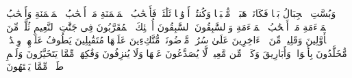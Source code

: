 \startbuffer[\q:56:5]
وَبُسَّتِ ٱلۡجِبَالُ بَسࣰّا%
\stopbuffer%
\startbuffer[\q:56:6]
فَكَانَتۡ هَبَاۤءࣰ مُّنۢبَثࣰّا%
\stopbuffer%
\startbuffer[\q:56:7]
وَكُنتُمۡ أَزۡوَٰجࣰا ثَلَٰثَةࣰ%
\stopbuffer%
\startbuffer[\q:56:8]
فَأَصۡحَٰبُ ٱلۡمَیۡمَنَةِ مَاۤ أَصۡحَٰبُ ٱلۡمَیۡمَنَةِ%
\stopbuffer%
\startbuffer[\q:56:9]
وَأَصۡحَٰبُ ٱلۡمَشۡءَمَةِ مَاۤ أَصۡحَٰبُ ٱلۡمَشۡءَمَةِ%
\stopbuffer%
\startbuffer[\q:56:10]
وَٱلسَّٰبِقُونَ ٱلسَّٰبِقُونَ%
\stopbuffer%
\startbuffer[\q:56:11]
أُو۟لَٰۤئِكَ ٱلۡمُقَرَّبُونَ%
\stopbuffer%
\startbuffer[\q:56:12]
فِی جَنَّٰتِ ٱلنَّعِیمِ%
\stopbuffer%
\startbuffer[\q:56:13]
ثُلَّةࣱ مِّنَ ٱلۡأَوَّلِینَ%
\stopbuffer%
\startbuffer[\q:56:14]
وَقَلِیلࣱ مِّنَ ٱلۡءَاخِرِینَ%
\stopbuffer%
\startbuffer[\q:56:15]
عَلَىٰ سُرُرࣲ مَّوۡضُونَةࣲ%
\stopbuffer%
\startbuffer[\q:56:16]
مُّتَّكِءِینَ عَلَیۡهَا مُتَقَٰبِلِینَ%
\stopbuffer%
\startbuffer[\q:56:17]
یَطُوفُ عَلَیۡهِمۡ وِلۡدَٰنࣱ مُّخَلَّدُونَ%
\stopbuffer%
\startbuffer[\q:56:18]
بِأَكۡوَابࣲ وَأَبَارِیقَ وَكَأۡسࣲ مِّن مَّعِینࣲ%
\stopbuffer%
\startbuffer[\q:56:19]
لَّا یُصَدَّعُونَ عَنۡهَا وَلَا یُنزِفُونَ%
\stopbuffer%
\startbuffer[\q:56:20]
وَفَٰكِهَةࣲ مِّمَّا یَتَخَیَّرُونَ%
\stopbuffer%
\startbuffer[\q:56:21]
وَلَحۡمِ طَیۡرࣲ مِّمَّا یَشۡتَهُونَ%
\stopbuffer%
